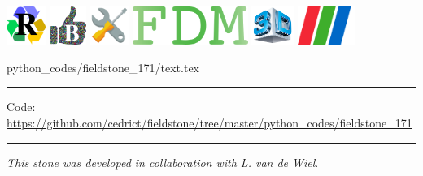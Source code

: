 \noindent
\includegraphics[height=1.25cm]{images/pictograms/replication}
\includegraphics[height=1.25cm]{images/pictograms/benchmark}
\includegraphics[height=1.25cm]{images/pictograms/tools}
\includegraphics[height=1.25cm]{images/pictograms/FDM}
\includegraphics[height=1.25cm]{images/pictograms/3d}
\includegraphics[height=1.25cm]{images/pictograms/paraview}


\begin{flushright} {\tiny {\color{gray} python\_codes/fieldstone\_171/text.tex}} \end{flushright}

%

\par\noindent\rule{\textwidth}{0.4pt}

\begin{center}
\inpython
{\small Code: \url{https://github.com/cedrict/fieldstone/tree/master/python_codes/fieldstone_171}}
\end{center}

\par\noindent\rule{\textwidth}{0.4pt}

{\sl This stone was developed in collaboration with L. van de Wiel}. 

